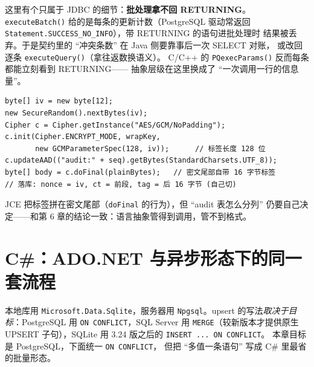 \documentclass[12pt,a4paper,fontset=fandol]{ctexbook}
\newcommand{\Fn}[1]{\texttt{#1()}}
\newcommand{\Tp}[1]{\texttt{#1}}
\newcommand{\CSharp}{C\#}
\newcommand{\CppJava}{C/C++}
\begin{document}
这里有个只属于 JDBC 的细节：\textbf{批处理拿不回 RETURNING}。
\Fn{executeBatch} 给的是每条的更新计数（PostgreSQL 驱动常返回
\Tp{Statement.\allowbreak SUCCESS\_NO\_INFO}），带 RETURNING 的语句进批处理时
结果被丢弃。于是契约里的 ``冲突条数'' 在 Java 侧要靠事后一次 SELECT 对账，
或改回逐条 \Fn{executeQuery}（拿往返数换语义）。
\CppJava{} 的 \Fn{PQexecParams} 反而每条都能立刻看到 RETURNING——
抽象层级在这里换成了 ``一次调用一行的信息量''。

\begin{lstlisting}[style=javastyle,caption={Java：JCE 密封（AES-GCM, AAD 绑序号）}]
byte[] iv = new byte[12];
new SecureRandom().nextBytes(iv);
Cipher c = Cipher.getInstance("AES/GCM/NoPadding");
c.init(Cipher.ENCRYPT_MODE, wrapKey,
       new GCMParameterSpec(128, iv));      // 标签长度 128 位
c.updateAAD(("audit:" + seq).getBytes(StandardCharsets.UTF_8));
byte[] body = c.doFinal(plainBytes);   // 密文尾部自带 16 字节标签
// 落库: nonce = iv, ct = 前段, tag = 后 16 字节 (自己切)
\end{lstlisting}

JCE 把标签拼在密文尾部（\Tp{doFinal} 的行为），但 ``audit 表怎么分列''
仍要自己决定——和第 6 章的结论一致：语言抽象管得到调用，管不到格式。

\section{\CSharp{}：ADO.NET 与异步形态下的同一套流程}

本地库用 \Tp{Microsoft.\allowbreak Data.\allowbreak Sqlite}，服务器用
\Tp{Npgsql}。upsert 的写法\emph{取决于目标}：PostgreSQL 用
\Tp{ON CONFLICT}，SQL Server 用 \Tp{MERGE}（较新版本才提供原生 UPSERT
子句），SQLite 用 3.24 版之后的 \Tp{INSERT ... ON CONFLICT}。
本章目标是 PostgreSQL，下面统一 \Tp{ON CONFLICT}，
但把 ``多值一条语句'' 写成 \CSharp{} 里最省的批量形态。
\end{document}
